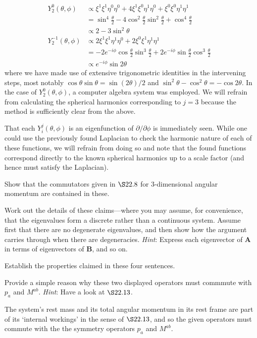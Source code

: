 \documentclass[../road-to-reality.tex]{subfiles}
\begin{document}
\begin{questions}
\begin{solution}
\begin{align*}
		Y_{2}^0(\theta, \phi) &\propto \xi^{1}\xi^{1}\eta^0\eta^0 + 4\xi^1\xi^0\eta^1\eta^0 + \xi^0\xi^0\eta^1\eta^1 \\
		&= \sin^4\tfrac{\theta}{2} - 4\cos^2\tfrac{\theta}{2}\sin^2\tfrac{\theta}{2} + \cos^4\tfrac{\theta}{2} \\
		&\propto 2 - 3\sin^2\theta \\
		Y_{2}^{-1}(\theta, \phi) &\propto 2\xi^1\xi^1\eta^1\eta^0 + 2\xi^0\xi^1\eta^1\eta^1 \\
		&= -2e^{-i\phi}\cos\tfrac{\theta}{2}\sin^3\tfrac{\theta}{2} + 2e^{-i\phi}\sin\tfrac{\theta}{2}\cos^3\tfrac{\theta}{2} \\
		&\propto e^{-i\phi}\sin2\theta
	\end{align*}
	where we have made use of extensive trigonometric identities in the intervening steps, most notably $\cos\theta\sin\theta = \sin(2\theta)/2$ and $\sin^2\theta - \cos^2\theta = {-\cos2\theta}$. In the case of $Y_{2}^{0}(\theta, \phi)$, a computer algebra system was employed. We will refrain from calculating the spherical harmonics corresponding to $j=3$ because the method is sufficiently clear from the above.
	
	That each $Y_{i}^{j}(\theta, \phi)$ is an eigenfunction of $\partial/\partial\phi$ is immediately seen. While one could use the previously found Laplacian to check the harmonic nature of each of these functions, we will refrain from doing so and note that the found functions correspond directly to the known spherical harmonics up to a scale factor (and hence must satisfy the Laplacian).
\end{solution}

\question Show that the commutators given in $\S 22.8$ for $3$-dimensional angular momentum are contained in these.

\question Work out the details of these claims---where you may assume, for convenience, that the eigenvalues form a discrete rather than a continuous system. Assume first that there are no degenerate eigenvalues, and then show how the argument carries through when there are degeneracies. \textit{Hint}: Express each eigenvector of $\mathbf{A}$ in terms of eigenvectors of $\mathbf{B}$, and so on.

\question Establish the properties claimed in these four sentences.

\question Provide a simple reason why these two displayed operators must commmute with $p_a$ and $M^{ab}$. \textit{Hint}: Have a look at $\S 22.13$.

\begin{solution}
	The system's rest mass and its total angular momentum in its rest frame are part of its `internal workings' in the sense of $\S 22.13$, and so the given operators must commute with the the symmetry operators $p_a$ and $M^{ab}$.
\end{solution}


\end{questions}
\end{document}

